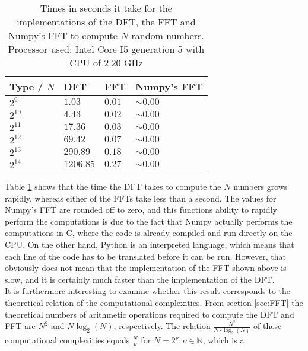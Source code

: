 \begin{table}[H]
\centering
\begin{tabular}{|l|l|l|l|}
\hline
Type / $N$ & DFT	   & FFT 	 & Numpy's FFT \\ \hline
$2^9$  	   & $1.03$    & $0.01$  & $\sim 0.00$ \\ \hline
$2^{10}$   & $4.43$    & $0.02$  & $\sim 0.00$ \\ \hline
$2^{11}$   & $17.36$   & $0.03$  & $\sim 0.00$ \\ \hline
$2^{12}$   & $69.42$   & $0.07$  & $\sim 0.00$ \\ \hline
$2^{13}$   & $290.89$  & $0.18$  & $\sim 0.00$ \\ \hline
$2^{14}$   & $1206.85$ & $0.27$  & $\sim 0.00$ \\ \hline
\end{tabular}
\caption{Times in seconds it take for the implementations of the DFT, the FFT and Numpy's FFT to compute $N$ random numbers. Processor used: Intel Core I5 generation 5 with CPU of 2.20 GHz}
\label{tab:FTcompare}
\end{table}

Table \ref{tab:FTcompare} shows that the time the DFT takes to compute the $N$ numbers grows rapidly, whereas either of the FFTs take less than a second. The values for Numpy's FFT are rounded off to zero, and this functions ability to rapidly perform the computations is due to the fact that Numpy actually performs the computations in C, where the code is already compiled and run directly on the CPU. On the other hand, Python is an interpreted language, which means that each line of the code has to be translated before it can be run. However, that obviously does not mean that the implementation of the FFT shown above is slow, and it is certainly much faster than the implementation of the DFT. \\
It is furthermore interesting to examine whether this result corresponds to the theoretical relation of the computational complexities. From section \ref{sec:FFT} the theoretical numbers of arithmetic operations required to compute the DFT and FFT are $N^2$ and $N\log_2(N)$, respectively. The relation $\frac{N^2}{N \cdot \log_2(N)}$ of these computational complexities equals $\frac{N}{\nu}$ for $N = 2^\nu, \nu \in \mathbb{N}$, which is a 


